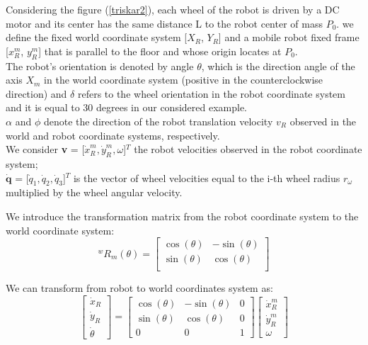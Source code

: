 Considering the figure (\ref{triskar2}), each wheel of the robot is driven by a DC motor and its center has the same distance L to the robot center of mass $P_0$. we define the fixed world coordinate system [$X_R$, $Y_R$] and a mobile robot fixed frame [${x}^m_R$, ${y}^m_R$] that is parallel to the floor and whose origin locates at $P_0$.\\
The robot's orientation is denoted by angle $\theta$, which is the direction angle of the axis $X_m$ in the world coordinate system (positive in the
counterclockwise direction) and $\delta$ refers to the wheel orientation in the robot coordinate system and it is equal to 30 degrees in our considered example.
\\
$\alpha$ and $\phi$ denote the direction of the robot translation velocity $v_R$ observed in the world and robot coordinate systems, respectively.\\
We consider \textbf{v} = [$\dot{x}^m_R,\dot{y}^m_R,\omega$]$^T$ the robot velocities observed in the robot coordinate system; \\
$\mathbf{\dot{q}}$ = [$\dot{q}_1,\dot{q}_2,\dot{q}_3$]$^T$ is the vector of wheel velocities equal to the i-th wheel radius $r_\omega$ multiplied by the wheel angular velocity.

We introduce the transformation matrix from the robot coordinate system to the world coordinate system:
\begin{equation}
^wR_m(\theta)=\begin{bmatrix}
\cos(\theta) &-\sin(\theta)\\
\sin(\theta) & \cos(\theta)\\
\end{bmatrix}
\end{equation}

We can transform from robot to world coordinates system as:
\begin{equation}
\begin{bmatrix}
\dot{x}_R\\
\dot{y}_R\\
\dot{\theta}
\end{bmatrix} =
\begin{bmatrix}
\cos(\theta) &-\sin(\theta) & 0\\
\sin(\theta) & \cos(\theta) & 0\\
0 & 0 & 1
\end{bmatrix}
\begin{bmatrix}
\dot{x}^m_R\\
\dot{y}^m_R\\
\omega
\end{bmatrix}
\label{eq:rotation}
\end{equation}

